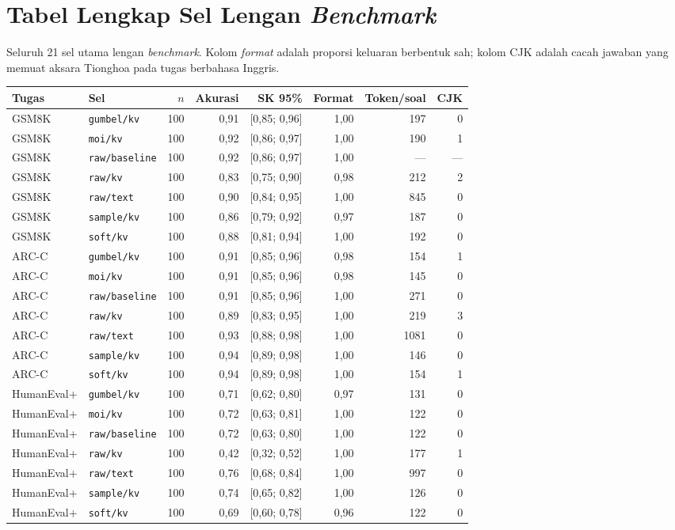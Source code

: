 
\chapter{Tabel Lengkap Sel Lengan \textit{Benchmark}}
\label{lamp:sel-bench}

Seluruh 21 sel utama lengan \textit{benchmark}. Kolom \textit{format} adalah proporsi keluaran berbentuk sah; kolom CJK adalah cacah jawaban yang memuat aksara Tionghoa pada tugas berbahasa Inggris.

\begin{longtable}{llrrrrrr}
\hline
Tugas & Sel & $n$ & Akurasi & SK 95\% & Format & Token/soal & CJK \\
\hline\endhead
GSM8K & \texttt{gumbel/kv} & 100 & 0,91 & [0,85; 0,96] & 1,00 & 197 & 0 \\
GSM8K & \texttt{moi/kv} & 100 & 0,92 & [0,86; 0,97] & 1,00 & 190 & 1 \\
GSM8K & \texttt{raw/baseline} & 100 & 0,92 & [0,86; 0,97] & 1,00 & --- & --- \\
GSM8K & \texttt{raw/kv} & 100 & 0,83 & [0,75; 0,90] & 0,98 & 212 & 2 \\
GSM8K & \texttt{raw/text} & 100 & 0,90 & [0,84; 0,95] & 1,00 & 845 & 0 \\
GSM8K & \texttt{sample/kv} & 100 & 0,86 & [0,79; 0,92] & 0,97 & 187 & 0 \\
GSM8K & \texttt{soft/kv} & 100 & 0,88 & [0,81; 0,94] & 1,00 & 192 & 0 \\
\hline
ARC-C & \texttt{gumbel/kv} & 100 & 0,91 & [0,85; 0,96] & 0,98 & 154 & 1 \\
ARC-C & \texttt{moi/kv} & 100 & 0,91 & [0,85; 0,96] & 0,98 & 145 & 0 \\
ARC-C & \texttt{raw/baseline} & 100 & 0,91 & [0,85; 0,96] & 1,00 & 271 & 0 \\
ARC-C & \texttt{raw/kv} & 100 & 0,89 & [0,83; 0,95] & 1,00 & 219 & 3 \\
ARC-C & \texttt{raw/text} & 100 & 0,93 & [0,88; 0,98] & 1,00 & 1081 & 0 \\
ARC-C & \texttt{sample/kv} & 100 & 0,94 & [0,89; 0,98] & 1,00 & 146 & 0 \\
ARC-C & \texttt{soft/kv} & 100 & 0,94 & [0,89; 0,98] & 1,00 & 154 & 1 \\
\hline
HumanEval+ & \texttt{gumbel/kv} & 100 & 0,71 & [0,62; 0,80] & 0,97 & 131 & 0 \\
HumanEval+ & \texttt{moi/kv} & 100 & 0,72 & [0,63; 0,81] & 1,00 & 122 & 0 \\
HumanEval+ & \texttt{raw/baseline} & 100 & 0,72 & [0,63; 0,80] & 1,00 & 122 & 0 \\
HumanEval+ & \texttt{raw/kv} & 100 & 0,42 & [0,32; 0,52] & 1,00 & 177 & 1 \\
HumanEval+ & \texttt{raw/text} & 100 & 0,76 & [0,68; 0,84] & 1,00 & 997 & 0 \\
HumanEval+ & \texttt{sample/kv} & 100 & 0,74 & [0,65; 0,82] & 1,00 & 126 & 0 \\
HumanEval+ & \texttt{soft/kv} & 100 & 0,69 & [0,60; 0,78] & 0,96 & 122 & 0 \\
\hline
\end{longtable}


